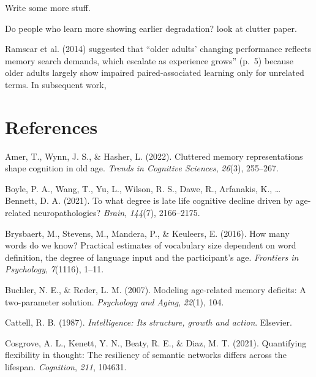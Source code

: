\documentclass[
  man]{apa6}
\newlength{\cslhangindent}
\newlength{\cslentryspacingunit} %
\newenvironment{CSLReferences}[2] %
 {%
  \setlength{\parindent}{0pt}
  \ifodd #1
  \let\oldpar\par
  \def\par{\hangindent=\cslhangindent\oldpar}
  \fi
  \setlength{\parskip}{#2\cslentryspacingunit}
 }%
 {}
\begin{document}
Write some more stuff.

Do people who learn more showing earlier degradation? look at clutter paper.

Ramscar et al. (2014) suggested that ``older adults' changing performance reflects memory search demands, which escalate as experience grows'' (p.~5) because older adults largely show impaired paired-associated learning only for unrelated terms. In subsequent work,

\newpage

\hypertarget{references}{%
\section{References}\label{references}}

\hypertarget{refs}{}
\begin{CSLReferences}{1}{0}
\leavevmode{}%
Amer, T., Wynn, J. S., \& Hasher, L. (2022). Cluttered memory representations shape cognition in old age. \emph{Trends in Cognitive Sciences}, \emph{26}(3), 255--267.

\leavevmode{}%
Boyle, P. A., Wang, T., Yu, L., Wilson, R. S., Dawe, R., Arfanakis, K., \ldots{} Bennett, D. A. (2021). To what degree is late life cognitive decline driven by age-related neuropathologies? \emph{Brain}, \emph{144}(7), 2166--2175.

\leavevmode{}%
Brysbaert, M., Stevens, M., Mandera, P., \& Keuleers, E. (2016). How many words do we know? Practical estimates of vocabulary size dependent on word definition, the degree of language input and the participant's age. \emph{Frontiers in Psychology}, \emph{7}(1116), 1--11.

\leavevmode{}%
Buchler, N. E., \& Reder, L. M. (2007). Modeling age-related memory deficits: A two-parameter solution. \emph{Psychology and Aging}, \emph{22}(1), 104.

\leavevmode{}%
Cattell, R. B. (1987). \emph{Intelligence: Its structure, growth and action}. Elsevier.

\leavevmode{}%
Cosgrove, A. L., Kenett, Y. N., Beaty, R. E., \& Diaz, M. T. (2021). Quantifying flexibility in thought: The resiliency of semantic networks differs across the lifespan. \emph{Cognition}, \emph{211}, 104631.


\end{CSLReferences}
\end{document}
